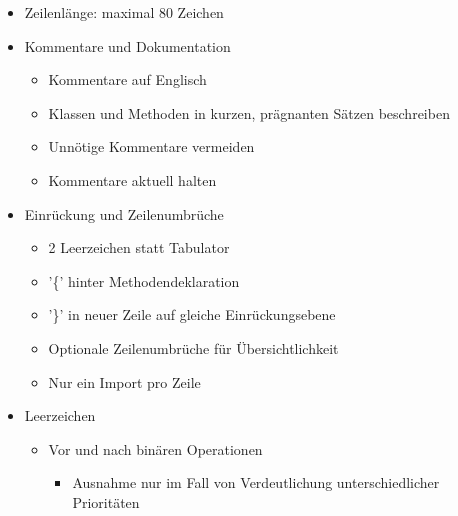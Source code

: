 \documentclass[twoside]{report}
\begin{document}
\begin{itemize}
	\item Zeilenlänge: maximal 80 Zeichen\par
	\item Kommentare und Dokumentation\par

\begin{itemize}
	\item Kommentare auf Englisch\par
	\item Klassen und Methoden in kurzen, prägnanten Sätzen beschreiben\par
	\item Unnötige Kommentare vermeiden\par
	\item Kommentare aktuell halten\par
\end{itemize}

	\item Einrückung und Zeilenumbrüche\par

\begin{itemize}
	\item 2 Leerzeichen statt Tabulator\par
	\item '\{' hinter Methodendeklaration\par
	\item '\}' in neuer Zeile auf gleiche Einrückungsebene\par
	\item Optionale Zeilenumbrüche für Übersichtlichkeit\par
	\item Nur ein Import pro Zeile\par
\end{itemize}

	\item Leerzeichen\par

\begin{itemize}
	\item Vor und nach binären Operationen\par

\begin{itemize}
	\item Ausnahme nur im Fall von Verdeutlichung unterschiedlicher Prioritäten\par
\end{itemize}


\end{itemize}
\end{itemize}
\end{document}
